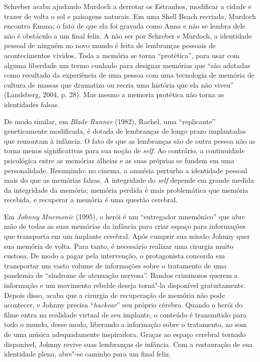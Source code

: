 Schreber acaba ajudando Murdoch a derrotar os Estranhos, modificar a
cidade e trazer de volta o sol e paisagens naturais. Em uma Shell Beach
recriada, Murdoch encontra Emma; o fato de que ela foi gravada como Anna
e não se lembra dele não é obstáculo a um final feliz. A não ser por
Schreber e Murdoch, a identidade pessoal de ninguém no novo mundo é
feita de lembranças pessoais de acontecimentos vividos. Toda a memória
se torna ``protética'', para usar com alguma liberdade um termo cunhado
para designar memórias que ``são adotadas como resultado da experiência
de uma pessoa com uma tecnologia de memória de cultura de massas que
dramatiza ou recria uma história que ela não viveu'' (Landsberg, 2004,
p. 28). Mas mesmo a memoria protética não torna as identidades falsas.

De modo similar, em \emph{Blade Runner} (1982), Rachel, uma
``replicante'' geneticamente modificada, é dotada de lembranças de longo
prazo implantadas que remontam à infância. O fato de que as lembranças
são de outra pessoa não as torna menos significativas para sua noção de
\emph{self}. Ao contrário, a continuidade psicológica entre as memórias alheias
e as suas próprias se fundem em uma personalidade. Resumindo: no cinema,
a amnésia perturba a identidade pessoal mais do que as memórias falsas.
A integridade do \emph{self} depende em grande medida da integridade da
memória; memória perdida é mais problemática que memória recebida, e
recuperar a memória é uma questão cerebral.

Em \emph{Johnny Mnemonic} (1995), o herói é um ``entregador mnemônico''
que abre mão de todas as suas memórias da infância para criar espaço
para informações que transporta em um implante cerebral. Após cumprir
sua missão Johnny quer sua memória de volta. Para tanto, é necessário
realizar uma cirurgia muito custosa. De modo a pagar pela intervenção, o
protagonista concorda em transportar um vasto volume de informações
sobre o tratamento de uma pandemia de ``síndrome de atenuação nervosa''.
Bandos criminosos querem a informação e um movimento rebelde deseja
torná"-la disponível gratuitamente. Depois disso, acaba que a cirurgia de
recuperação de memória não pode acontecer, e Johnny precisa
``\emph{hackear}'' seu próprio cérebro. Quando o herói do filme entra na
realidade virtual de seu implante, o conteúdo é transmitido para todo o
mundo, desse modo, liberando a informação sobre o tratamento, ao som de
uma música adequadamente inspiradora. Graças ao espaço cerebral tornado
disponível, Johnny revive suas lembranças de infância. Com a restauração
de sua identidade plena, abre"-se caminho para um final feliz.


